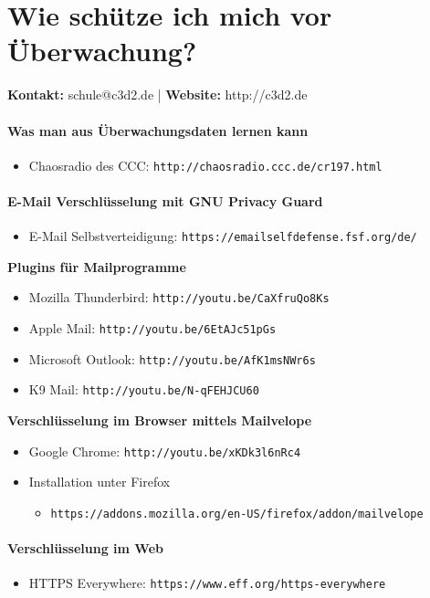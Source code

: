 \part*{Wie schütze ich mich vor Überwachung?}
\textbf{Kontakt:} schule@c3d2.de | \textbf{Website:} http://c3d2.de
\vspace{2mm}

\subsection*{Was man aus Überwachungsdaten lernen kann}
\begin{itemize}
    \item Chaosradio des CCC: \texttt{http://chaosradio.ccc.de/cr197.html}
\end{itemize}

\subsection*{E-Mail Verschlüsselung mit GNU Privacy Guard}
\begin{itemize}
    \item E-Mail Selbstverteidigung: \texttt{https://emailselfdefense.fsf.org/de/}
\end{itemize}
\textbf{Plugins für Mailprogramme}
\begin{itemize}
   \item Mozilla Thunderbird: \texttt{http://youtu.be/CaXfruQo8Ks}
   \item Apple Mail: \texttt{http://youtu.be/6EtAJc51pGs}  
   \item Microsoft Outlook: \texttt{http://youtu.be/AfK1msNWr6s} 
   \item K9 Mail: \texttt{http://youtu.be/N-qFEHJCU60} 
\end{itemize}
\textbf{Verschlüsselung im Browser mittels Mailvelope}
\begin{itemize}
   \item Google Chrome: \texttt{http://youtu.be/xKDk3l6nRc4}
   \item Installation unter Firefox
      \begin{itemize}
         \item[] \footnotesize{\texttt{https://addons.mozilla.org/en-US/firefox/addon/mailvelope}} 
      \end{itemize}
\end{itemize}

\subsection*{Verschlüsselung im Web}
\begin{itemize}
  \item HTTPS Everywhere: \texttt{https://www.eff.org/https-everywhere}
\end{itemize}